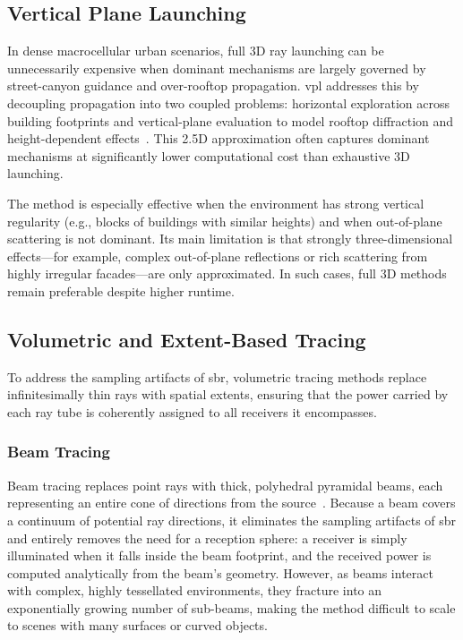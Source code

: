\subsection{Vertical Plane Launching}

In dense macrocellular urban scenarios, full 3D ray launching can be unnecessarily expensive when dominant mechanisms are largely governed by street-canyon guidance and over-rooftop propagation. \Gls{vpl} addresses this by decoupling propagation into two coupled problems: horizontal exploration across building footprints and vertical-plane evaluation to model rooftop diffraction and height-dependent effects~. This 2.5D approximation often captures dominant mechanisms at significantly lower computational cost than exhaustive 3D launching.

The method is especially effective when the environment has strong vertical regularity (e.g., blocks of buildings with similar heights) and when out-of-plane scattering is not dominant. Its main limitation is that strongly three-dimensional effects---for example, complex out-of-plane reflections or rich scattering from highly irregular facades---are only approximated. In such cases, full 3D methods remain preferable despite higher runtime.

\subsection{Volumetric and Extent-Based Tracing}

To address the sampling artifacts of \gls{sbr}, volumetric tracing methods replace infinitesimally thin rays with spatial extents, ensuring that the power carried by each ray tube is coherently assigned to all receivers it encompasses.

\subsubsection{Beam Tracing}

Beam tracing replaces point rays with thick, polyhedral pyramidal beams, each representing an entire cone of directions from the source~. Because a beam covers a continuum of potential ray directions, it eliminates the sampling artifacts of \gls{sbr} and entirely removes the need for a reception sphere: a receiver is simply illuminated when it falls inside the beam footprint, and the received power is computed analytically from the beam's geometry. However, as beams interact with complex, highly tessellated environments, they fracture into an exponentially growing number of sub-beams, making the method difficult to scale to scenes with many surfaces or curved objects.

